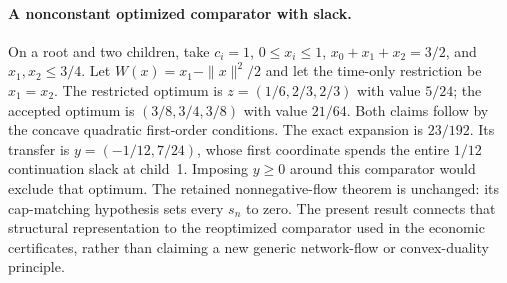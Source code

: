 \paragraph{A nonconstant optimized comparator with slack.}
On a root and two children, take $c_i=1$, $0\leq x_i\leq1$,
$x_0+x_1+x_2=3/2$, and $x_1,x_2\leq3/4$.
Let $W(x)=x_1-\|x\|^2/2$ and let the time-only restriction be $x_1=x_2$.
The restricted optimum is $z=(1/6,2/3,2/3)$ with value $5/24$;
the accepted optimum is $(3/8,3/4,3/8)$ with value $21/64$.
Both claims follow by the concave quadratic first-order conditions.
The exact expansion is $23/192$. Its transfer is
$y=(-1/12,7/24)$, whose first coordinate spends the entire $1/12$
continuation slack at child~1. Imposing $y\geq0$ around this comparator would
exclude that optimum. The retained nonnegative-flow theorem is unchanged:
its cap-matching hypothesis sets every $s_n$ to zero. The present result
connects that structural representation to the reoptimized comparator used
in the economic certificates, rather than claiming a new generic network-flow
or convex-duality principle.
